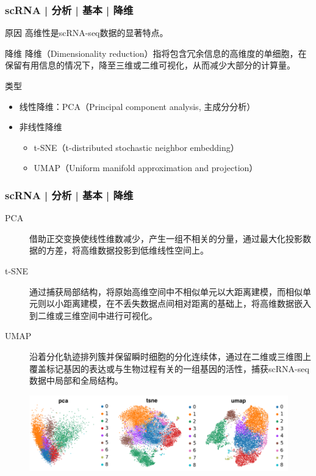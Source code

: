 \documentclass[11pt]{ctexbeamer}
\begin{document}
\begin{frame}
  \frametitle{scRNA | 分析 | 基本 | 降维}
  \begin{block}{原因}
  	高维性是scRNA-seq数据的显著特点。
  \end{block}
 \begin{block}{降维}
 	降维（Dimensionality reduction）指将包含冗余信息的高维度的单细胞，在保留有用信息的情况下，降至三维或二维可视化，从而减少大部分的计算量。
\end{block}
 \begin{alertblock}{类型}
 	\begin{itemize}
 		\item 线性降维：PCA（Principal component analysis, 主成分分析）
 		\item 非线性降维
 		\begin{itemize}
 			\item t-SNE（t-distributed stochastic neighbor embedding）
 			\item UMAP（Uniform manifold approximation and projection）
 		\end{itemize}
 	\end{itemize}
\end{alertblock}
\end{frame}

\begin{frame}
  \frametitle{scRNA | 分析 | 基本 | 降维}
  {\footnotesize
  \begin{description}
    \item[PCA] 借助正交变换使线性维数减少，产生一组不相关的分量，通过最大化投影数据的方差，将高维数据投影到低维线性空间上。
  	\item[t-SNE] 通过捕获局部结构，将原始高维空间中不相似单元以大距离建模，而相似单元则以小距离建模，在不丢失数据点间相对距离的基础上，将高维数据嵌入到二维或三维空间中进行可视化。
  	\item[UMAP] 沿着分化轨迹排列簇并保留瞬时细胞的分化连续体，通过在二维或三维图上覆盖标记基因的表达或与生物过程有关的一组基因的活性，捕获scRNA-seq数据中局部和全局结构。
  \end{description}
}
    \begin{figure}
  	\includegraphics[width=\textwidth]{scRNA_dims_01.png}
  \end{figure}
\end{frame}
\end{document}

